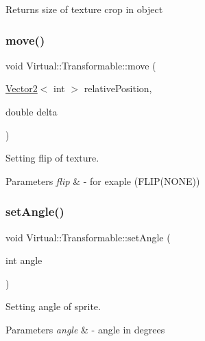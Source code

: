 \begin{DoxyReturn}{Returns}
size of texture crop in object 
\end{DoxyReturn}
\hypertarget{class_virtual_1_1_transformable_a80eb3848090682f3ad3bd3faf879f6ab}{}\label{class_virtual_1_1_transformable_a80eb3848090682f3ad3bd3faf879f6ab} 
\subsubsection{\texorpdfstring{move()}{move()}}
{\footnotesize\ttfamily void Virtual\+::\+Transformable\+::move (\begin{DoxyParamCaption}\item[{\hyperlink{struct_virtual_1_1_vector2}{Vector2}$<$ int $>$}]{relative\+Position,  }\item[{double}]{delta }\end{DoxyParamCaption})}



Setting flip of texture. 


\begin{DoxyParams}{Parameters}
{\em flip} & -\/ for exaple (F\+L\+I\+P(\+N\+O\+N\+E)) \\
\hline
\end{DoxyParams}
\hypertarget{class_virtual_1_1_transformable_ae7305c3fe8a7bd9f4a1138a9d097bfab}{}\label{class_virtual_1_1_transformable_ae7305c3fe8a7bd9f4a1138a9d097bfab} 
\subsubsection{\texorpdfstring{set\+Angle()}{setAngle()}}
{\footnotesize\ttfamily void Virtual\+::\+Transformable\+::set\+Angle (\begin{DoxyParamCaption}\item[{int}]{angle }\end{DoxyParamCaption})}



Setting angle of sprite. 


\begin{DoxyParams}{Parameters}
{\em angle} & -\/ angle in degrees \\
\hline
\end{DoxyParams}
\hypertarget{class_virtual_1_1_transformable_a558026b1336c4f24c2bc70debc01800c}{}\label{class_virtual_1_1_transformable_a558026b1336c4f24c2bc70debc01800c} 
